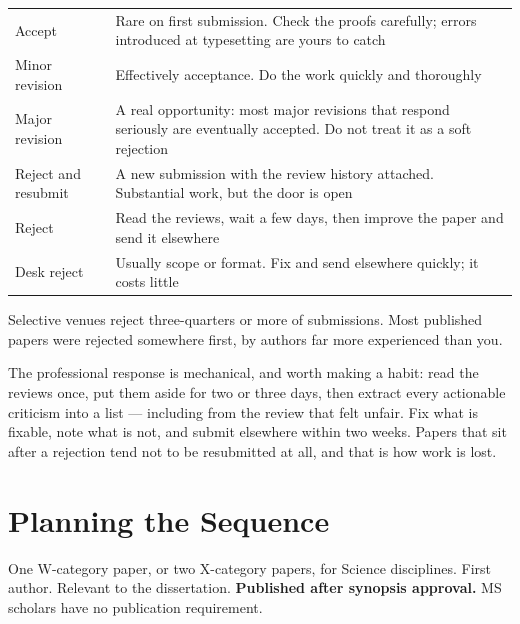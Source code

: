\begin{center}
\small
\begin{tabular}{@{}L{3.4cm}L{10.9cm}@{}}
\toprule
Accept              & Rare on first submission. Check the proofs carefully;
                      errors introduced at typesetting are yours to catch \\
Minor revision      & Effectively acceptance. Do the work quickly and
                      thoroughly \\
Major revision      & A real opportunity: most major revisions that respond
                      seriously are eventually accepted. Do not treat it as a
                      soft rejection \\
Reject and resubmit & A new submission with the review history attached.
                      Substantial work, but the door is open \\
Reject              & Read the reviews, wait a few days, then improve the paper
                      and send it elsewhere \\
Desk reject         & Usually scope or format. Fix and send elsewhere quickly;
                      it costs little \\
\bottomrule
\end{tabular}
\end{center}

\begin{conceptbox}
Selective venues reject three-quarters or more of submissions. Most published
papers were rejected somewhere first, by authors far more experienced than you.

\medskip
The professional response is mechanical, and worth making a habit: read the
reviews once, put them aside for two or three days, then extract every
actionable criticism into a list --- including from the review that felt
unfair. Fix what is fixable, note what is not, and submit elsewhere within two
weeks. Papers that sit after a rejection tend not to be resubmitted at all,
and that is how work is lost.
\end{conceptbox}

\section{Planning the Sequence}

\begin{regbox}
One W-category paper, or two X-category papers, for Science disciplines. First
author. Relevant to the dissertation. \textbf{Published after synopsis
approval.} MS scholars have no publication requirement.
\end{regbox}

